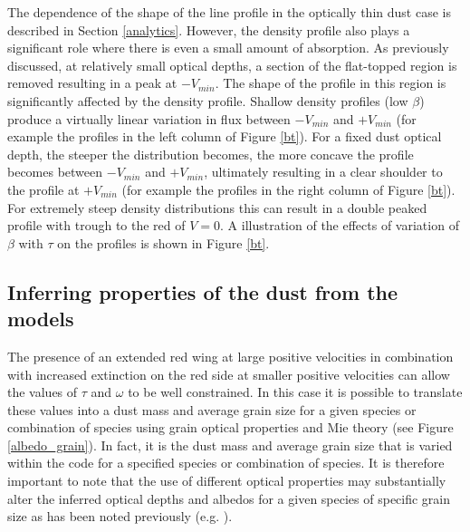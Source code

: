 \documentclass[useAMS,usenatbib,usegraphicx]{mnras}
\begin{document}
The dependence of the shape of the line profile in the optically thin dust case 
is described in Section \ref{analytics}.  However, the density profile 
also plays a significant role where there is even a small amount of 
absorption.  As previously discussed, at relatively small optical depths, 
a section of the flat-topped region is removed resulting in a peak at 
$-V_{min}$.  The shape of the profile in this region is significantly 
affected by the density profile.  Shallow density profiles (low $\beta$) produce a virtually 
linear variation in flux between $-V_{min}$ and $+V_{min}$ (for example the profiles in the left column of Figure \ref{bt}).  For a fixed dust
optical depth, the steeper the distribution becomes, the more concave the 
profile becomes between $-V_{min}$ and $+V_{min}$, ultimately resulting in 
a clear shoulder to the profile at $+V_{min}$  (for example the profiles in the right column of Figure \ref{bt}).  For extremely steep density
distributions this can result in a double peaked profile with 
trough to the red of $V=0$.  A illustration of the effects of variation of 
$\beta$ with $\tau$ on the profiles is shown in Figure \ref{bt}.

\subsection{Inferring properties of the dust from the models}





The presence of an extended red wing at large positive velocities in 
combination with increased extinction on the red side at smaller positive 
velocities can allow the values of $\tau$ and $\omega$ to be well 
constrained.  In this case it is possible to translate these values into a 
dust mass and average grain size for a given species or combination of 
species using grain optical properties and Mie theory (see Figure 
\ref{albedo_grain}).  In fact, it is the dust mass and average grain size 
that is varied within the code for a specified species or combination of 
species.  It is therefore important to note that the use of different 
optical properties may substantially alter the inferred optical depths and 
albedos for a given species of specific grain size as has been noted 
previously (e.g. \citet{Owen2015}).
\end{document}
